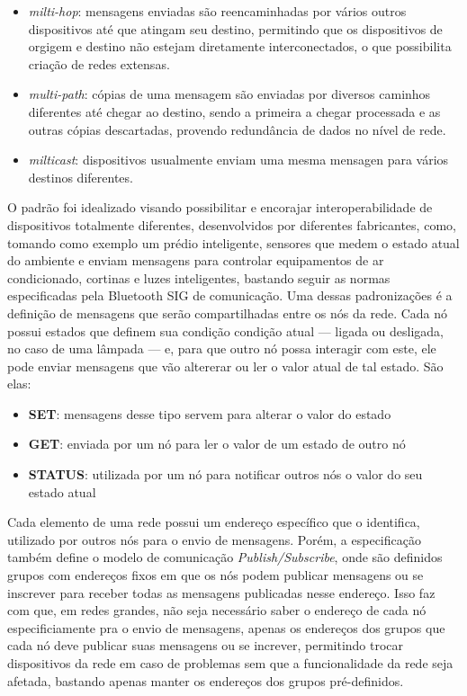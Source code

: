 \documentclass[../monografia.tex]{subfiles}
\begin{document}
\begin{itemize}
	\item \textit{milti-hop}: mensagens enviadas são reencaminhadas por vários outros dispositivos até que atingam seu destino, permitindo que os dispositivos de orgigem e destino não estejam diretamente interconectados, o que possibilita criação de redes extensas.
	\item \textit{multi-path}: cópias de uma mensagem são enviadas por diversos caminhos diferentes até chegar ao destino, sendo a primeira a chegar processada e as outras cópias descartadas, provendo redundância de dados no nível de rede.
	\item \textit{milticast}: dispositivos usualmente enviam uma mesma mensagen para vários destinos diferentes.
\end{itemize}

O padrão foi idealizado visando possibilitar e encorajar interoperabilidade de dispositivos totalmente diferentes, desenvolvidos por diferentes fabricantes, como, tomando como exemplo um prédio inteligente, sensores que medem o estado atual do ambiente e enviam mensagens para controlar equipamentos de ar condicionado, cortinas e luzes inteligentes, bastando seguir as normas especificadas pela Bluetooth SIG de comunicação. Uma dessas padronizações é a definição de mensagens que serão compartilhadas entre os nós da rede. Cada nó possui estados que definem sua condição condição atual --- ligada ou desligada, no caso de uma lâmpada --- e, para que outro nó possa interagir com este, ele pode enviar mensagens que vão altererar ou ler o valor atual de tal estado. São elas:

\begin{itemize}
	\item \textbf{SET}: mensagens desse tipo servem para alterar o valor do estado
	\item \textbf{GET}: enviada por um nó para ler o valor de um estado de outro nó
	\item \textbf{STATUS}: utilizada por um nó para notificar outros nós o valor do seu estado atual
\end{itemize}

Cada elemento de uma rede possui um endereço específico que o identifica, utilizado por outros nós para o envio de mensagens. Porém, a especificação também define o modelo de comunicação \textit{Publish/Subscribe}, onde são definidos grupos com endereços fixos em que os nós podem publicar mensagens ou se inscrever para receber todas as mensagens publicadas nesse endereço. Isso faz com que, em redes grandes, não seja necessário saber o endereço de cada nó especificiamente pra o envio de mensagens, apenas os endereços dos grupos que cada nó deve publicar suas mensagens ou se increver, permitindo trocar dispositivos da rede em caso de problemas sem que a funcionalidade da rede seja afetada, bastando apenas manter os endereços dos grupos pré-definidos.
\end{document}
